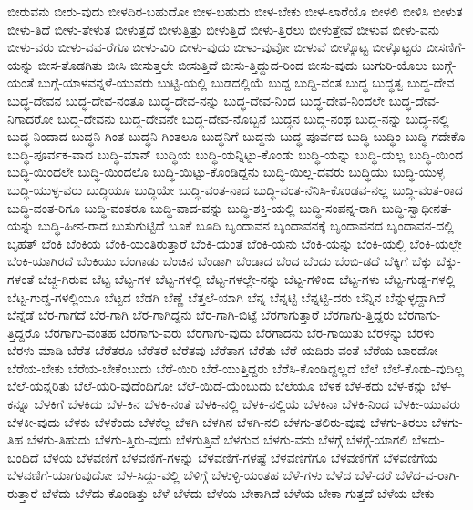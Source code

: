 {ಬೀರುವನು
ಬೀರು-ವುದು
ಬೀಳದಿರ-ಬಹುದೋ
ಬೀಳ-ಬಹುದು
ಬೀಳ-ಬೇಕು
ಬೀಳ-ಲಾರೆಯೊ
ಬೀಳಲಿ
ಬೀಳಿಸಿ
ಬೀಳುತ
ಬೀಳು-ತಿದೆ
ಬೀಳು-ತೇಳುತ
ಬೀಳುತ್ತದೆ
ಬೀಳುತ್ತಿತ್ತು
ಬೀಳುತ್ತಿದೆ
ಬೀಳು-ತ್ತಿರಲು
ಬೀಳುತ್ತೇವೆ
ಬೀಳುವ
ಬೀಳು-ವನು
ಬೀಳು-ವರು
ಬೀಳು-ವವ-ರೆಗೂ
ಬೀಳು-ವಿರಿ
ಬೀಳು-ವುದು
ಬೀಳು-ವುವೋ
ಬೀಳುವೆ
ಬೀಳ್ಕೊಟ್ಟ
ಬೀಳ್ಕೊಟ್ಟರು
ಬೀಸಣಿಗೆ-ಯನ್ನು
ಬೀಸ-ತೊಡಗಿತು
ಬೀಸಿ
ಬೀಸುತ್ತಲೇ
ಬೀಸುತ್ತಿದೆ
ಬೀಸು-ತ್ತಿದ್ದುದ-ರಿಂದ
ಬೀಸು-ವುದು
ಬುಗುರಿ-ಯೊಲು
ಬುಗ್ಗೆ-ಯಂತೆ
ಬುಗ್ಗೆ-ಯಾಳವನ್ನಳೆ-ಯುವರು
ಬುಟ್ಟಿ-ಯಲ್ಲಿ
ಬುಡದಲ್ಲಿಯೆ
ಬುದ್ದ
ಬುದ್ದಿ-ವಂತ
ಬುದ್ಧ
ಬುದ್ಧತ್ವ
ಬುದ್ಧ-ದೇವ
ಬುದ್ಧ-ದೇವನ
ಬುದ್ಧ-ದೇವ-ನಂತೂ
ಬುದ್ಧ-ದೇವ-ನನ್ನು
ಬುದ್ಧ-ದೇವ-ನಿಂದ
ಬುದ್ಧ-ದೇವ-ನಿಂದಲೇ
ಬುದ್ಧ-ದೇವ-ನಿಗಾದರೋ
ಬುದ್ಧ-ದೇವನು
ಬುದ್ಧ-ದೇವನೇ
ಬುದ್ಧ-ದೇವ-ನೊಬ್ಬನೆ
ಬುದ್ಧನ
ಬುದ್ಧ-ನಂಥ
ಬುದ್ಧ-ನನ್ನು
ಬುದ್ಧ-ನಲ್ಲಿ
ಬುದ್ಧ-ನಿಂದಾದ
ಬುದ್ಧನಿ-ಗಿಂತ
ಬುದ್ಧನಿ-ಗಿಂತಲೂ
ಬುದ್ಧನಿಗೆ
ಬುದ್ಧನು
ಬುದ್ಧ-ಪೂರ್ವದ
ಬುದ್ಧಿ
ಬುದ್ಧಿಂ
ಬುದ್ಧಿ-ಗದೇಕೊ
ಬುದ್ಧಿ-ಪೂರ್ವಕ-ವಾದ
ಬುದ್ಧಿ-ಮಾನ್
ಬುದ್ಧಿಯ
ಬುದ್ಧಿ-ಯನ್ನಿಟ್ಟು-ಕೊಂಡು
ಬುದ್ಧಿ-ಯನ್ನು
ಬುದ್ಧಿ-ಯಲ್ಲ
ಬುದ್ಧಿ-ಯಿಂದ
ಬುದ್ಧಿ-ಯಿಂದಲೇ
ಬುದ್ಧಿ-ಯಿಂದಲೊ
ಬುದ್ಧಿ-ಯಿಟ್ಟು-ಕೊಂಡಿದ್ದನು
ಬುದ್ಧಿ-ಯಿಲ್ಲ-ದವರು
ಬುದ್ಧಿಯು
ಬುದ್ಧಿ-ಯುಳ್ಳ
ಬುದ್ಧಿ-ಯುಳ್ಳ-ವರು
ಬುದ್ಧಿಯೂ
ಬುದ್ಧಿಯೇ
ಬುದ್ಧಿ-ವಂತ-ನಾದ
ಬುದ್ಧಿ-ವಂತ-ನೆನಿಸಿ-ಕೊಂಡವ-ನಲ್ಲ
ಬುದ್ಧಿ-ವಂತ-ರಾದ
ಬುದ್ಧಿ-ವಂತ-ರಿಗೂ
ಬುದ್ಧಿ-ವಂತರೂ
ಬುದ್ಧಿ-ವಾದ-ವನ್ನು
ಬುದ್ಧಿ-ಶಕ್ತಿ-ಯಲ್ಲಿ
ಬುದ್ಧಿ-ಸಂಪನ್ನ-ರಾಗಿ
ಬುದ್ಧಿ-ಸ್ವಾಧೀನತೆ-ಯನ್ನು
ಬುದ್ಧಿ-ಹೀನ-ರಾದ
ಬುಸುಗುಟ್ಟಿದೆ
ಬೂಕೆ
ಬೂದಿ
ಬೃಂದಾವನ
ಬೃಂದಾವನಕ್ಕೆ
ಬೃಂದಾವನದ
ಬೃಂದಾವನ-ದಲ್ಲಿ
ಬೃಹತ್
ಬೆಂಕಿ
ಬೆಂಕಿಯ
ಬೆಂಕಿ-ಯಂತಿರುತ್ತಾರೆ
ಬೆಂಕಿ-ಯಂತೆ
ಬೆಂಕಿ-ಯನು
ಬೆಂಕಿ-ಯನ್ನು
ಬೆಂಕಿ-ಯಲ್ಲಿ
ಬೆಂಕಿ-ಯಲ್ಲೇ
ಬೆಂಕಿ-ಯಾಗಿರದೆ
ಬೆಂಕಿಯು
ಬೆಂಗಾಡು
ಬೆಂಚಿನ
ಬೆಂಡಾಗಿ
ಬೆಂಡಾದ
ಬೆಂದ
ಬೆಂದು
ಬೆಂಬಿ-ಡದೆ
ಬೆಕ್ಕಿಗೆ
ಬೆಕ್ಕು
ಬೆಕ್ಕು-ಗಳಂತೆ
ಬೆಚ್ಚ-ಗಿರುವ
ಬೆಟ್ಟ
ಬೆಟ್ಟ-ಗಳ
ಬೆಟ್ಟ-ಗಳಲ್ಲಿ
ಬೆಟ್ಟ-ಗಳಲ್ಲೇ-ನನ್ನು
ಬೆಟ್ಟ-ಗಳಿಂದ
ಬೆಟ್ಟ-ಗಳು
ಬೆಟ್ಟ-ಗುಡ್ಡ-ಗಳಲ್ಲಿ
ಬೆಟ್ಟ-ಗುಡ್ಡ-ಗಳಲ್ಲಿಯೂ
ಬೆಟ್ಟದ
ಬೆಡಗಿ
ಬೆಣ್ಣೆ
ಬೆತ್ತಲೆ-ಯಾಗಿ
ಬೆನ್ನ
ಬೆನ್ನಟ್ಟಿ
ಬೆನ್ನಟ್ಟಿ-ದರು
ಬೆನ್ನಿನ
ಬೆನ್ನುಳ್ಳದ್ದಾಗಿದೆ
ಬೆನ್ನೆಡೆ
ಬೆರ-ಗಾಗದೆ
ಬೆರ-ಗಾಗಿ
ಬೆರ-ಗಾಗಿದ್ದನು
ಬೆರ-ಗಾಗಿ-ಬಿಟ್ಟೆ
ಬೆರಗಾಗುತ್ತಾರೆ
ಬೆರಗಾಗು-ತ್ತಿದ್ದರು
ಬೆರಗಾಗು-ತ್ತಿದ್ದರೊ
ಬೆರಗಾಗು-ವಂತಹ
ಬೆರಗಾಗು-ವರು
ಬೆರಗಾಗು-ವುದು
ಬೆರಗಾದನು
ಬೆರ-ಗಾಯಿತು
ಬೆರಳನ್ನು
ಬೆರಳು
ಬೆರಳು-ಮಾಡಿ
ಬೆರೆತ
ಬೆರೆತರೂ
ಬೆರೆತರೆ
ಬೆರೆತವು
ಬೆರೆತಾಗ
ಬೆರೆತು
ಬೆರೆ-ಯದಿರು-ವಂತೆ
ಬೆರೆಯ-ಬಾರದೋ
ಬೆರೆಯ-ಬೇಕು
ಬೆರೆಯ-ಬೇಕೆಂಬುದು
ಬೆರೆ-ಯಿರಿ
ಬೆರೆ-ಯುತ್ತಿದ್ದರು
ಬೆರೆಸಿ-ಕೊಂಡಿದ್ದಲ್ಲದೆ
ಬೆಲೆ
ಬೆಲೆ-ಕೊಡು-ವುದಿಲ್ಲ
ಬೆಲೆ-ಯನ್ನರಿತು
ಬೆಲೆ-ಯರಿ-ವುದೆಂದಿಗೋ
ಬೆಲೆ-ಯಿದೆ-ಯೆಂಬುದು
ಬೆಲೆಯೂ
ಬೆಳಕ
ಬೆಳ-ಕದು
ಬೆಳ-ಕನ್ನು
ಬೆಳ-ಕನ್ನೂ
ಬೆಳಕಿಗೆ
ಬೆಳಕಿದು
ಬೆಳ-ಕಿನ
ಬೆಳಕಿ-ನಂತೆ
ಬೆಳಕಿ-ನಲ್ಲಿ
ಬೆಳಕಿ-ನಲ್ಲಿಯೆ
ಬೆಳಕಿನಾ
ಬೆಳಕಿ-ನಿಂದ
ಬೆಳಕೀ-ಯುವರು
ಬೆಳಕೀ-ವುದು
ಬೆಳಕು
ಬೆಳಕೆಂದು
ಬೆಳಕೆಲ್ಲ
ಬೆಳಗಿ
ಬೆಳಗಿನ
ಬೆಳಗಿ-ನಲಿ
ಬೆಳಗು-ತಲಿರು-ವುವು
ಬೆಳಗು-ತಿರಲು
ಬೆಳಗು-ತಿಹ
ಬೆಳಗು-ತಿಹುದು
ಬೆಳಗು-ತ್ತಿರು-ವುದು
ಬೆಳಗುತ್ತಿವೆ
ಬೆಳಗುವ
ಬೆಳಗು-ವನು
ಬೆಳಗ್ಗೆ
ಬೆಳಗ್ಗೆ-ಯಾಗಲಿ
ಬೆಳದು-ಬಂದಿದೆ
ಬೆಳಯ
ಬೆಳವಣಿಗೆ
ಬೆಳವಣಿಗೆ-ಗಳನ್ನು
ಬೆಳವಣಿಗೆ-ಗಳಷ್ಟೆ
ಬೆಳವಣಿಗೆಗೂ
ಬೆಳವಣಿಗೆಗೆ
ಬೆಳವಣಿಗೆಯ
ಬೆಳವಣಿಗೆ-ಯಾಗುವುದೋ
ಬೆಳ-ಸಿದ್ದು-ವಲ್ಲಿ
ಬೆಳಿಗ್ಗೆ
ಬೆಳುಳ್ಳಿ-ಯಂತಹ
ಬೆಳೆ-ಗಳು
ಬೆಳೆದ
ಬೆಳೆ-ದರೆ
ಬೆಳೆದ-ವ-ರಾಗಿ-ರುತ್ತಾರೆ
ಬೆಳೆದು
ಬೆಳೆದು-ಕೊಂಡಿತ್ತು
ಬೆಳೆ-ಬೆಳೆದು
ಬೆಳೆಯ-ಬೇಕಾಗಿದೆ
ಬೆಳೆಯ-ಬೇಕಾ-ಗುತ್ತದೆ
ಬೆಳೆಯ-ಬೇಕು
}
